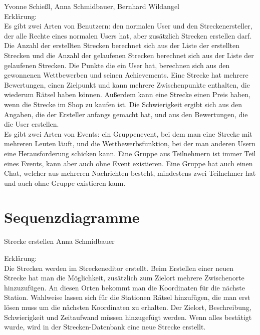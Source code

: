 \documentclass[a4paper, 12pt]{article}
\begin{document}
\begin{figure}[H] 
\centering
\end{figure}
Yvonne Schießl, Anna Schmidbauer, Bernhard Wildangel\\
Erklärung:\\
Es gibt zwei Arten von Benutzern: den normalen User und den Streckenersteller, der alle Rechte eines normalen Users hat, aber zusätzlich Strecken erstellen darf. Die Anzahl der erstellten Strecken berechnet sich aus der Liste der erstellten Strecken und die Anzahl der gelaufenen Strecken berechnet sich aus der Liste der gelaufenen Strecken. Die Punkte die ein User hat, berechnen sich aus den gewonnenen Wettbewerben und seinen Achievements.
Eine Strecke hat mehrere Bewertungen, einen Zielpunkt und kann mehrere Zwischenpunkte enthalten, die wiederum Rätsel haben können. Außerdem kann eine Strecke einen Preis haben, wenn die Strecke im Shop zu kaufen ist. Die Schwierigkeit ergibt sich aus den Angaben, die der Ersteller anfangs gemacht hat, und aus den Bewertungen, die die User erstellen.\\
Es gibt zwei Arten von Events: ein Gruppenevent, bei dem man eine Strecke mit mehreren Leuten läuft, und die Wettbewerbsfunktion, bei der man anderen Usern eine Herausforderung schicken kann. Eine Gruppe aus Teilnehmern ist immer Teil eines Events, kann aber auch ohne Event existieren. Eine Gruppe hat auch einen Chat, welcher aus mehreren Nachrichten besteht, mindestens zwei Teilnehmer hat und auch ohne Gruppe existieren kann.\\

\section{Sequenzdiagramme}

{\Large Strecke erstellen}
Anna Schmidbauer
\begin{figure}[H] 
\centering
\end{figure}

Erklärung:\\
Die Strecken werden im Streckeneditor erstellt. Beim Erstellen einer neuen Strecke hat man die Möglichkeit, zusätzlich zum Zielort mehrere Zwischenorte hinzuzufügen. An diesen Orten bekommt man die Koordinaten für die nächste Station. Wahlweise lassen sich für die Stationen Rätsel hinzufügen, die man erst lösen muss um die nächsten Koordinaten zu erhalten. Der Zielort, Beschreibung, Schwierigkeit und Zeitaufwand müssen hinzugefügt werden. Wenn alles bestätigt wurde, wird in der Strecken-Datenbank eine neue Strecke erstellt.\\
\end{document}
